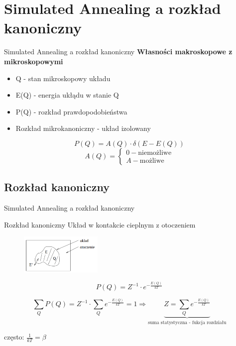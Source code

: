 \section{Simulated Annealing a rozkład kanoniczny}
	
	\begin{frame}{Simulated Annealing a rozkład kanoniczny}
		\textbf{Własności makroskopowe z mikroskopowymi}
		\begin{itemize}
			\item Q - stan mikroskopowy układu
			\item E(Q) - energia ukłądu w stanie Q
			\item P(Q) - rozkład prawdopodobieństwa 
			\item Rozkład mikrokanoniczny - układ izolowany
		\end{itemize}
		$$
		P(Q) = A(Q) \cdot \delta(E - E(Q))
		$$
		$$
		A(Q) = \begin{cases}
		0 - \text{niemożliwe} \\
		A - \text{możliwe}
		\end{cases}
		$$
	\end{frame}

\subsection{Rozkład kanoniczny}

	\begin{frame}{Simulated Annealing a rozkład kanoniczny}
		\begin{block}{Rozkład kanoniczny}
			Układ w kontakcie cieplnym z otoczeniem
		\end{block}
		
		\begin{figure}
			\includegraphics[width=0.35\textwidth]{img/18/canonical_distribution}
		\end{figure}
		
		$$
		P(Q) = Z^{-1} \cdot e^{-\frac{E(Q)}{kT}}
		$$
		
		$$
		\sum_Q P(Q) = Z^{-1} \cdot \sum_Q e^{-\frac{E(Q)}{kT}} = 1 \Rightarrow \underbrace{Z = \sum_Q e^{-\frac{E(Q)}{kT}}}_{\text{suma statystyczna - fukcja rozdziału}}
		$$
		
		często: $\frac{1}{kT} = \beta$
	\end{frame}

